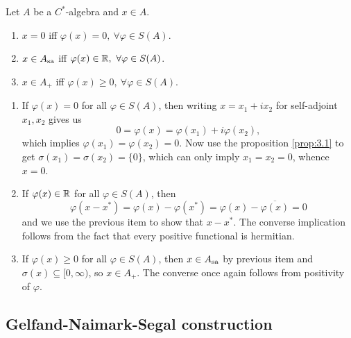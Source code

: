 \begin{proposition}\label{prop:3.1}
  Let $A$ be a $C^*$-algebra and $x \in A$.
  \begin{enumerate}
    \item $x = 0$ iff $\varphi (x) = 0,\ \forall \varphi \in S(A)$.
    \item $x \in A_{\operatorname{sa}}$ iff $\varphi (x) \in \mathbb {R},\ \forall \varphi \in S(A)$.
    \item $x \in A_+$ iff $\varphi (x) \geq 0,\ \forall \varphi \in S(A)$.
  \end{enumerate}
\end{proposition}

\begin{myproof}
  \begin{enumerate}
    \item If $\varphi (x) = 0$ for all $\varphi \in S(A)$, then writing $x = x_1 + i x_2$
    for self-adjoint $x_1, x_2$ gives us 
    $$0 = \varphi(x) = \varphi(x_1) + i \varphi(x_2),$$
    which implies $\varphi(x_1) = \varphi(x_2) = 0$. Now
    use the proposition \ref{prop:3.1} to get $\sigma(x_1) = \sigma(x_2) = \{0\}$, which can only imply $x_1 = x_2 = 0$, whence $x= 0$.
    \item If $\varphi(x) \in \mathbb {R}$ for all $\varphi \in S(A)$, then 
    $$\varphi(x - x^*) = \varphi(x) - \varphi(x^*) = \varphi(x) - \overline{\varphi(x)} = 0$$
    and we use the previous item to show that $x - x^*$. The converse implication follows from the fact that every positive functional is hermitian.
    \item If $\varphi(x) \geq 0$ for all $\varphi \in S(A)$, then $x \in A_{\operatorname{sa}}$
    by previous item and $\sigma(x) \subseteq [0, \infty)$, so $x \in A_+$.
    The converse once again follows from positivity of $\varphi$. \qedhere
  \end{enumerate}
\end{myproof}

\subsection{Gelfand-Naimark-Segal construction}

